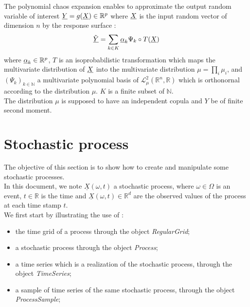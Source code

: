 

The polynomial chaos expansion enables to approximate the output random variable of interest ${\underline{Y}} = g({\underline{X}}) \in \mathbb{R}^p$ where ${\underline{X}}$ is the input random vector of dimension $n$ by the  response surface :
$$
\tilde{{\underline{Y}}} = \sum_{k \in K} {\underline{\alpha}}_k \Psi_k \circ T({\underline{X}})
$$
where $ {\underline{\alpha}}_k \in \mathbb{R}^p$, $T$ is an isoprobabilistic transformation which maps the multivariate distribution of ${\underline{X}}$ into the multivariate distribution $\mu = \prod_i \mu_i$, and $(\Psi_k)_{k \in \mathbb{N}}$ a multivariate polynomial basis of $\mathcal{L}^2_{\mu}(\mathbb{R}^n,\mathbb{R})$ which is orthonornal according to the distribution $\mu$. $K$ is a finite subset of $\mathbb{N}$. \\
The distribution $\mu$ is supposed to have an independent copula and $Y$ be of finite second moment.



\newpage 
\newpage 


\newpage \section{Stochastic process}


The objective of this section is to show how to create and manipulate  some stochastic processes. \\

In this document, we note  $\underline{X}(\omega,t)$ a stochastic process, where $\omega \in \Omega$ is an event, $t \in \mathbb{R}$ is the time and $\underline{X}(\omega,t) \in \mathbb{R}^d$ are the observed values of the process at each time stamp $t$.\\


We first start by illustrating the use of  : 
\begin{itemize}
  \item the time grid of a process through the object \emph{RegularGrid};
  \item a stochastic process through the object \emph{Process};
  \item a time series which is a realization of the stochastic process, through the object \emph{TimeSeries};
  \item a sample of time series of the same stochastic process, through the object \emph{ProcessSample};
\end{itemize}

